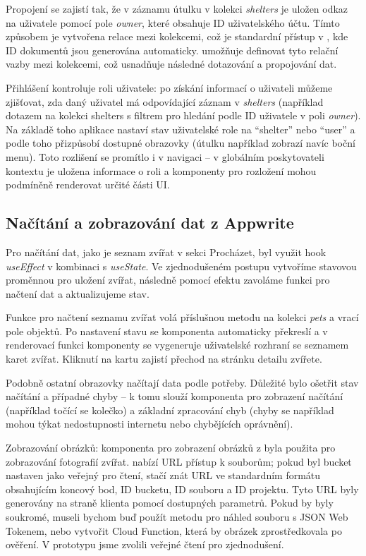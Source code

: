 \documentclass[czech, bp, kiv, he, iso690numb, pdf]{fasthesis}
\begin{document}
    Propojení se zajistí tak, že v záznamu útulku v kolekci \textit{shelters} je uložen odkaz na uživatele pomocí pole \textit{owner}, které obsahuje ID uživatelského účtu. Tímto způsobem je vytvořena relace mezi kolekcemi, což je standardní přístup v , kde ID dokumentů jsou generována automaticky.  umožňuje definovat tyto relační vazby mezi kolekcemi, což usnadňuje následné dotazování a propojování dat.

    Přihlášení kontroluje roli uživatele: po získání informací o uživateli můžeme zjišťovat, zda daný uživatel má odpovídající záznam v \textit{shelters} (například dotazem na kolekci shelters s filtrem pro hledání podle ID uživatele v poli \textit{owner}). Na základě toho aplikace nastaví stav uživatelské role na ``shelter'' nebo ``user'' a podle toho přizpůsobí dostupné obrazovky (útulku například zobrazí navíc boční menu). Toto rozlišení se promítlo i v  navigaci – v globálním poskytovateli kontextu je uložena informace o roli a komponenty pro rozložení mohou podmíněně renderovat určité části UI.

    \subsection{Načítání a zobrazování dat z Appwrite}

    Pro načítání dat, jako je seznam zvířat v sekci Procházet, byl využit hook \textit{useEffect} v kombinaci s \textit{useState}. Ve zjednodušeném postupu vytvoříme stavovou proměnnou pro uložení zvířat, následně pomocí efektu zavoláme funkci pro načtení dat a aktualizujeme stav.

    Funkce pro načtení seznamu zvířat volá příslušnou metodu  na kolekci \textit{pets} a vrací pole objektů. Po nastavení stavu se komponenta automaticky překreslí a v renderovací funkci komponenty se vygeneruje uživatelské rozhraní se seznamem karet zvířat. Kliknutí na kartu zajistí přechod na stránku detailu zvířete.

    Podobně ostatní obrazovky načítají data podle potřeby. Důležité bylo ošetřit stav načítání a případné chyby – k tomu slouží komponenta pro zobrazení načítání (například točící se kolečko) a základní zpracování chyb (chyby  se například mohou týkat nedostupnosti internetu nebo chybějících oprávnění).

    Zobrazování obrázků: komponenta pro zobrazení obrázků z  byla použita pro zobrazování fotografií zvířat.  nabízí URL přístup k souborům; pokud byl bucket nastaven jako veřejný pro čtení, stačí znát URL ve standardním formátu obsahujícím koncový bod, ID bucketu, ID souboru a ID projektu. Tyto URL byly generovány na straně klienta pomocí dostupných parametrů. Pokud by byly soukromé, museli bychom buď použít metodu pro náhled souboru s JSON Web Tokenem, nebo vytvořit Cloud Function, která by obrázek zprostředkovala po ověření. V prototypu jsme zvolili veřejné čtení pro zjednodušení.
\end{document}

